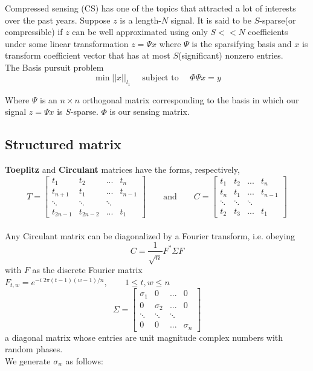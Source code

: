 Compressed sensing (CS) has one of the topics that attracted a lot of interests over the past years. Suppose $z$ is a length-$N$ signal. It is said to be $S$-sparse(or compressible) if $z$ can be well approximated using only $S << N$ coefficients under some linear transformation
$ z=\Psi x $
where $\Psi$ is the sparsifying basis and $x$ is transform coefficient vector that has at most $S$(significant) nonzero entries.
\\

The Basis pursuit problem 
\begin{equation}
\min ||x||_{l_1} \quad \text{ subject to } \quad \Phi \Psi x=y
\end{equation}


Where $\Psi$ is an $n \times n$ orthogonal matrix corresponding to the basis in which our signal $z = \Psi x$ is $S$-sparse. $\Phi$ is our sensing matrix. 
\\
\subsection*{Structured matrix}
\textbf{Toeplitz} and \textbf{Circulant} matrices have the forms, respectively,
\\

$$
T = \begin{bmatrix}
t_{1}    & t_{2}    & ...    & t_{n}   \\[0.3em]
t_{n+1}  & t_{1}    & ...    & t_{n-1} \\[0.3em]
\ddots   & \ddots   & \ddots &         \\[0.3em]
t_{2n-1} & t_{2n-2} & ...    & t_{1}         
\end{bmatrix}
\qquad \text{and} \qquad
C = \begin{bmatrix}
t_{1}  & t_{2}  & ...    & t_{n}   \\[0.3em]
t_{n}  & t_{1}  & ...    & t_{n-1} \\[0.3em]
\ddots & \ddots & \ddots &         \\[0.3em]
t_{2}  & t_{3}  & ...    & t_{1}        
\end{bmatrix} 
$$
\\
	Any Circulant matrix can be diagonalized by a Fourier transform, i.e. obeying
	$$ C=\frac{1}{\sqrt{n}} F^* \Sigma F $$ with $F$ as the discrete Fourier matrix
	$F_{t,w}=e^{-i\; 2\pi(t-1)(w-1)/n}, \qquad 1 \le t,w \le n$
	$$
	\Sigma = \begin{bmatrix}
	\sigma_{1} & 0 & ...& 0           \\[0.3em]
	0 & \sigma_{2} & ... & 0 \\[0.3em]
	\ddots &\ddots & \ddots &      \\[0.3em]
	0 & 0 & ... & \sigma_{n}        
	\end{bmatrix} $$
	a diagonal matrix whose entries are unit magnitude complex numbers with random phases.
\\
	We generate $\sigma_{w}$ as follows:
	\\[1em]
	
